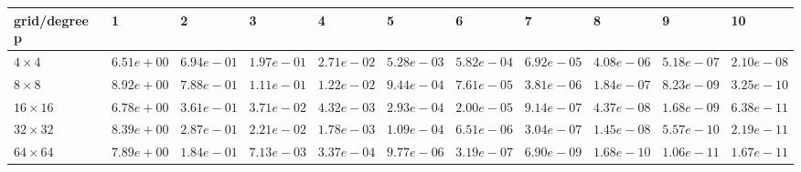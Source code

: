 \begin{tabular}{lllllllllll}
\hline
 grid/degree p   & 1          & 2          & 3          & 4          & 5          & 6          & 7          & 8          & 9          & 10         \\
\hline
 $4 \times 4$    & $6.51e+00$ & $6.94e-01$ & $1.97e-01$ & $2.71e-02$ & $5.28e-03$ & $5.82e-04$ & $6.92e-05$ & $4.08e-06$ & $5.18e-07$ & $2.10e-08$ \\
 $8 \times 8$    & $8.92e+00$ & $7.88e-01$ & $1.11e-01$ & $1.22e-02$ & $9.44e-04$ & $7.61e-05$ & $3.81e-06$ & $1.84e-07$ & $8.23e-09$ & $3.25e-10$ \\
 $16 \times 16$  & $6.78e+00$ & $3.61e-01$ & $3.71e-02$ & $4.32e-03$ & $2.93e-04$ & $2.00e-05$ & $9.14e-07$ & $4.37e-08$ & $1.68e-09$ & $6.38e-11$ \\
 $32 \times 32$  & $8.39e+00$ & $2.87e-01$ & $2.21e-02$ & $1.78e-03$ & $1.09e-04$ & $6.51e-06$ & $3.04e-07$ & $1.45e-08$ & $5.57e-10$ & $2.19e-11$ \\
 $64 \times 64$  & $7.89e+00$ & $1.84e-01$ & $7.13e-03$ & $3.37e-04$ & $9.77e-06$ & $3.19e-07$ & $6.90e-09$ & $1.68e-10$ & $1.06e-11$ & $1.67e-11$ \\
\hline
\end{tabular}